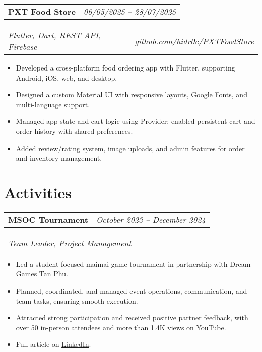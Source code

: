 \documentclass[a4paper,11pt]{article}
\begin{document}
\begin{minipage}[t]{\linewidth}
  \begin{tabularx}{\linewidth}{@{}l r@{}}
    \textbf{PXT Food Store} & \hspace*{0.63\linewidth}\normalsize\textit{06/05/2025 – 28/07/2025} \\
  \end{tabularx}
  \begin{tabularx}{\linewidth}{@{}l r@{}}
  \normalsize\textit{Flutter, Dart, REST API, Firebase} & \hspace*{0.405\linewidth}\href{https://github.com/hidr0c/PXTFoodStore}{\normalsize\textit{github.com/hidr0c/PXTFoodStore}}\\
  \end{tabularx}
 \begin{itemize} [nosep,leftmargin=1.2em,itemsep=2pt]
  \item Developed a cross-platform food ordering app with Flutter, supporting Android, iOS, web, and desktop.
  \item Designed a custom Material UI with responsive layouts, Google Fonts, and multi-language support.
  \item Managed app state and cart logic using Provider; enabled persistent cart and order history with shared preferences.
  \item Added review/rating system, image uploads, and admin features for order and inventory management. 
\end{itemize}
\end{minipage}

\section{Activities}
\begin{spacing}{1.05}
\begin{tabularx}{\linewidth}{@{}l r@{}}
  \textbf{MSOC Tournament} & \hspace*{0.54\linewidth}\normalsize\textit{October 2023 -- December 2024} \\
\end{tabularx}
\begin{tabularx}{\linewidth}{@{}l r@{}}
  \normalsize\textit{Team Leader, Project Management} 
  \end{tabularx}
\begin{itemize}[nosep,leftmargin=1.2em,itemsep=2pt]
  \item Led a student-focused maimai game tournament in partnership with Dream Games Tan Phu.
  \item Planned, coordinated, and managed event operations, communication, and team tasks, ensuring smooth execution.
  \item Attracted strong participation and received positive partner feedback, with over 50 in-person attendees and more than 1.4K views on YouTube.
  \item Full article on \href{https://www.linkedin.com/feed/update/urn:li:activity:7300042302784233472/}{\underline{LinkedIn}}.
\end{itemize}
\end{spacing}

\vspace*{\fill}
\end{document}
